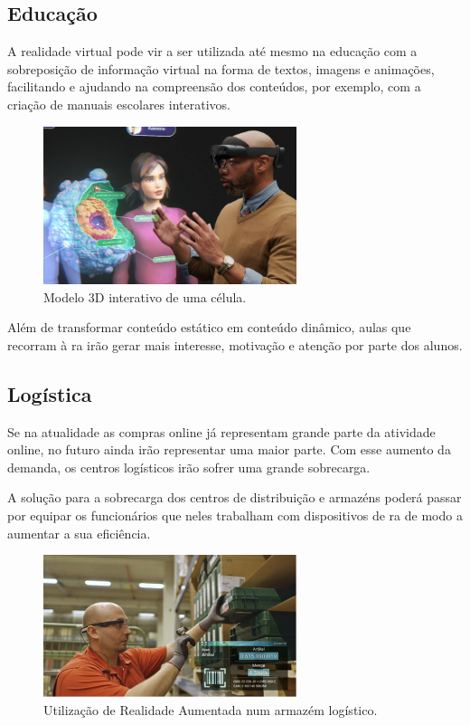 \documentclass{report}
\begin{document}
\subsection{Educação}
A realidade virtual pode vir a ser utilizada até mesmo na educação com a sobreposição de informação virtual na forma de textos, imagens e animações, facilitando e ajudando na compreensão dos conteúdos, por exemplo, com a criação de manuais escolares interativos.

\begin{figure}[H]
    \centering
    \includegraphics[width=20em]{education.png}
    \caption{Modelo 3D interativo de uma célula.}
    \label{Fig:education}
\end{figure}

Além de transformar conteúdo estático em conteúdo dinâmico, aulas que recorram à \ac{ra} irão gerar mais interesse, motivação e atenção por parte dos alunos.\cite{sinha_2021}

\subsection{Logística}
Se na atualidade as compras online já representam grande parte da atividade online, no futuro ainda irão representar uma maior parte. Com esse aumento da demanda, os centros logísticos irão sofrer uma grande sobrecarga.

A solução para a sobrecarga dos centros de distribuição e armazéns poderá passar por equipar os funcionários que neles trabalham com dispositivos de \ac{ra} de modo a aumentar a sua eficiência.

\begin{figure}[H]
    \centering
    \includegraphics[width=20em]{logistics.png}
    \caption{Utilização de Realidade Aumentada num armazém logístico.}
    \label{Fig:logistics}
\end{figure}
\end{document}
